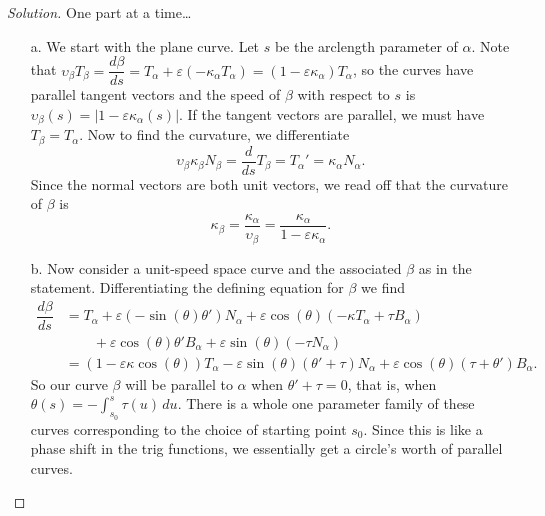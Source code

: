 \documentclass[Shifrin_Solutions_Spring_2018]{subfiles}
\begin{document}
\begin{proof}[Solution] One part at a time\dots
\begin{itemize}
\item[a.] We start with the plane curve. Let $s$ be the arclength parameter 
of $\alpha$. Note that $\upsilon_{\beta} T_{\beta} = \dfrac{d\beta}{ds} = 
T_{\alpha} + \varepsilon ( -\kappa_{\alpha} T_{\alpha} ) = 
(1-\varepsilon\kappa_{\alpha}) T_{\alpha}$, so the curves have parallel tangent 
vectors and the speed of $\beta$ with respect to $s$ is $\upsilon_{\beta}(s) = 
|1-\varepsilon\kappa_{\alpha}(s) |$. If the tangent vectors are parallel, we must 
have $T_{\beta} = T_{\alpha}$. Now to find the curvature, we differentiate
\[
\upsilon_{\beta} \kappa_{\beta} N_{\beta} = \dfrac{d}{ds} T_{\beta} = T_{\alpha}' 
= \kappa_{\alpha} N_{\alpha}.
\]
Since the normal vectors are both unit vectors, we read off that the curvature of 
$\beta$ is
\[
\kappa_{\beta} = \dfrac{\kappa_{\alpha}}{\upsilon_{\beta} } 
= \dfrac{\kappa_{\alpha}}{1-\varepsilon\kappa_{\alpha}} .
\]

\item[b.] Now consider a unit-speed space curve and the associated $\beta$ as 
in the statement. Differentiating the defining equation for $\beta$ we find
\[
\begin{split}
\dfrac{d\beta}{ds} & = T_{\alpha} 
 + \varepsilon( -\sin(\theta) \theta') N_{\alpha} 
 + \varepsilon\cos(\theta) (-\kappa T_{\alpha} + \tau B_{\alpha}) \\
& \qquad  + \varepsilon\cos(\theta) \theta' B_{\alpha} 
 + \varepsilon\sin(\theta) ( -\tau N_{\alpha})  \\
& = (1-\varepsilon\kappa\cos(\theta)) T_{\alpha} 
 - \varepsilon\sin(\theta) (\theta' + \tau) N_{\alpha} 
 + \varepsilon\cos(\theta) ( \tau + \theta') B_{\alpha} .
\end{split}
\]
So our curve $\beta$ will be parallel to $\alpha$ when $\theta' + \tau = 0$, that is, 
when $\theta(s) = -\int_{s_0}^s \tau(u) \, du$. There is a whole one parameter family  
of these curves corresponding to the choice of starting point $s_0$. Since this is like 
a phase shift in the trig functions, we essentially get a circle's worth of parallel 
curves.

\clearpage


\end{itemize}
\end{proof}
\end{document}
